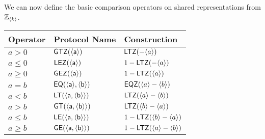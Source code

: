   We can now define the basic comparison operators on shared
  representations from ${\mathbb{Z}}_{\langle k \rangle}$.
  \begin{center}
    \begin{tabular}{|lll|}
      \hline
      Operator & Protocol Name                        & Construction                            \\
      \hline
      $a>0$    & $\mathsf{GTZ(\langle a \rangle)}$           & $\mathsf{LTZ}(-\langle a \rangle)$             \\
      $a\le0$  & $\mathsf{LEZ(\langle a \rangle)}$           & $1-\mathsf{LTZ}(-\langle a \rangle)$           \\
      $a\ge0$  & $\mathsf{GEZ(\langle a \rangle)}$           & $1-\mathsf{LTZ}(\langle a \rangle)$            \\
      $a=b$    & $\mathsf{EQ(\langle a \rangle,\langle b \rangle)}$ & $\mathsf{EQZ}(\langle a \rangle-\langle b \rangle)$   \\
      $a<b$    & $\mathsf{LT(\langle a,\langle b \rangle \rangle)}$ & $\mathsf{LTZ}(\langle a \rangle-\langle b \rangle)$   \\
      $a>b$    & $\mathsf{GT(\langle a,\langle b \rangle \rangle)}$ & $\mathsf{LTZ}(\langle b \rangle-\langle a \rangle)$   \\
      $a\le b$ & $\mathsf{LE(\langle a,\langle b \rangle \rangle)}$ & $1-\mathsf{LTZ}(\langle b \rangle-\langle a \rangle)$ \\
      $a\ge b$ & $\mathsf{GE(\langle a,\langle b \rangle \rangle)}$ & $1-\mathsf{LTZ}(\langle a \rangle-\langle b \rangle)$ \\
      \hline
    \end{tabular}
  \end{center}


  \iffalse
    ### NPS: This does not seem to be defined, or used
    \msubsubsection{$\mathsf{Mod2m}(a_{prime}, \sshare{a},k,\sshare{m}, \kappa)$:}
    This does the same operation as $\mathsf{Mod2m}$ above, but $m$ is now secret shared.
    \begin{enumerate}
      \item $\sshare{x_0},\ldots,\sshare{x_{k-1}}, \sshare{2^m} \asn \mathsf{B2U}(\sshare{m},k)$.
      \item $\sshare{2^{-m}} \asn \mathsf{Inv}(\sshare{2^m})$.
      \item $\sshare{r''}, \sshare{r}, \sshare{r}_B \asn \mathsf{PRandM}(k,k,\kappa)$.
      \item $\sshare{r'} \asn \sum_{i=0}^{k-1} 2^i \cdot \sshare{x_i} \cdot \sshare{r_i}$
      \item $c \asn \Open(\sshare{a}+\sshare{r''}+\sshare{r})$.
      \item For $i \in [1,\ldots,k=1]$ do $c_i' \asn c \pmod{2^i}$.
      \item $\sshare{c''} \asn \sum_{i=1}^{k-1} c_i' \cdot (\sshare{x_{i-1}}-\sshare{x_i})$.
      \item $\sshare{d} \asn \mathsf{LT}(\sshare{c''},\sshare{r'},k)$.
      \item $\sshare{b} \asn \sshare{c''}-\sshare{r'}+\sshare{2^m} \cdot \sshare{d}$.
      \item Return $\sshare{b}$.
    \end{enumerate}
  \fi

